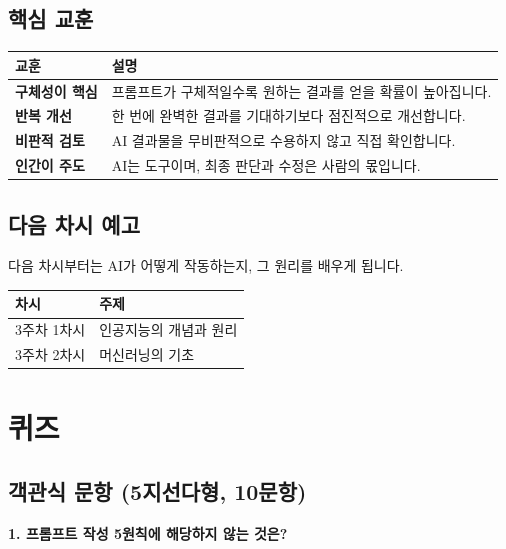 \documentclass[11pt,a4paper]{article}
\begin{document}
\subsection{핵심 교훈}

\begin{center}
\begin{tabular}{|l|l|}
\hline
\rowcolor{lightblue}
\textbf{교훈} & \textbf{설명} \\
\hline
\textbf{구체성이 핵심} & 프롬프트가 구체적일수록 원하는 결과를 얻을 확률이 높아집니다. \\
\hline
\textbf{반복 개선} & 한 번에 완벽한 결과를 기대하기보다 점진적으로 개선합니다. \\
\hline
\textbf{비판적 검토} & AI 결과물을 무비판적으로 수용하지 않고 직접 확인합니다. \\
\hline
\textbf{인간이 주도} & AI는 도구이며, 최종 판단과 수정은 사람의 몫입니다. \\
\hline
\end{tabular}
\end{center}

\subsection{다음 차시 예고}

다음 차시부터는 AI가 어떻게 작동하는지, 그 원리를 배우게 됩니다.

\begin{center}
\begin{tabular}{|l|l|}
\hline
\rowcolor{lightblue}
\textbf{차시} & \textbf{주제} \\
\hline
3주차 1차시 & 인공지능의 개념과 원리 \\
\hline
3주차 2차시 & 머신러닝의 기초 \\
\hline
\end{tabular}
\end{center}

\newpage

\section{퀴즈}

\subsection{객관식 문항 (5지선다형, 10문항)}

\textbf{1. 프롬프트 작성 5원칙에 해당하지 않는 것은?}
\end{document}
